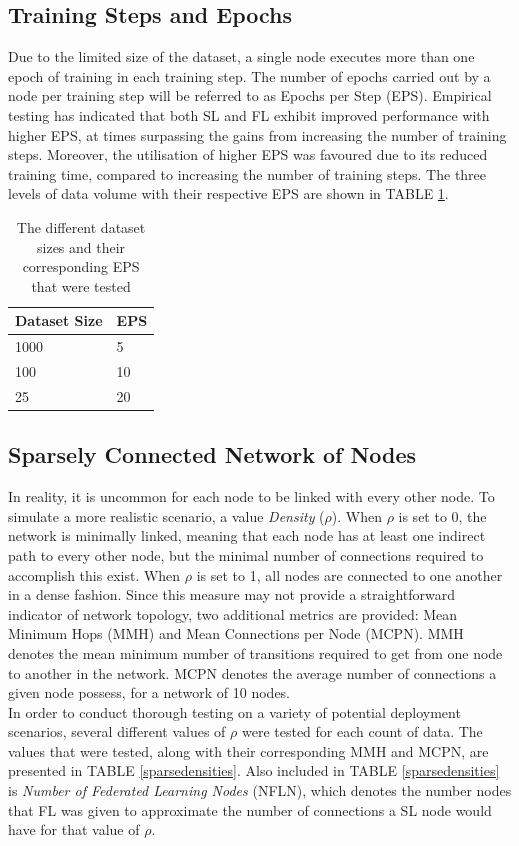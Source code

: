 \documentclass[letterpaper, 10 pt, conference]{ieeeconf}  %
\begin{document}
\subsection{Training Steps and Epochs}
Due to the limited size of the dataset, a single node executes more than one epoch of training in each training step. The number of epochs carried out by a node per training step will be referred to as Epochs per Step (EPS). Empirical testing has indicated that both SL and FL exhibit improved performance with higher EPS, at times surpassing the gains from increasing the number of training steps. Moreover, the utilisation of higher EPS was favoured due to its reduced training time, compared to increasing the number of training steps. The three levels of data volume with their respective EPS are shown in TABLE \ref{epsparams}.

\begin{table}[H]
	\centering
	\begin{tabular}{l|l}
		Dataset Size & EPS \\ \hline 
		1000   & 5  \\
		100   & 10  \\
		25  & 20 
	\end{tabular}
	\caption{The different dataset sizes and their corresponding EPS that were tested} \label{epsparams}
\end{table}

\subsection{Sparsely Connected Network of Nodes}
In reality, it is uncommon for each node to be linked with every other node. To simulate a more realistic scenario, a value \emph{Density} ($\rho$). When $\rho$ is set to 0, the network is minimally linked, meaning that each node has at least one indirect path to every other node, but the minimal number of connections required to accomplish this exist. When $\rho$ is set to 1, all nodes are connected to one another in a dense fashion. Since this measure may not provide a straightforward indicator of network topology, two additional metrics are provided:  Mean Minimum Hops (MMH) and Mean Connections per Node (MCPN). MMH denotes the mean minimum number of transitions required to get from one node to another in the network. MCPN denotes the average number of connections a given node possess, for a network of 10 nodes. \\

In order to conduct thorough testing on a variety of potential deployment scenarios, several different values of $\rho$ were tested for each count of data. The values that were tested, along with their corresponding MMH and MCPN, are presented in TABLE \ref{sparsedensities}. Also included in TABLE \ref{sparsedensities} is \emph{Number of Federated Learning Nodes} (NFLN), which denotes the number nodes that FL was given to approximate the number of connections a SL node would have for that value of $\rho$.
\end{document}
